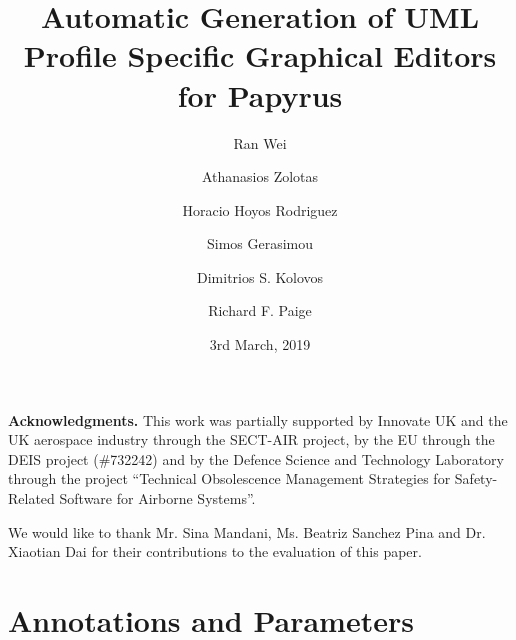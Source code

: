 \documentclass[global]{svjour}
\begin{document}
\title{Automatic Generation of UML Profile Specific Graphical Editors for Papyrus}

\author{Ran Wei \and Athanasios Zolotas \and Horacio Hoyos Rodriguez \and Simos Gerasimou \and Dimitrios S. Kolovos \and Richard F. Paige}

\date{3rd March, 2019}
\maketitle{}










\noindent\textbf{Acknowledgments.}
This work was partially supported by Innovate UK and the UK aerospace industry through the SECT-AIR project, by the EU through the DEIS project (\#732242) and by the Defence Science and Technology Laboratory through the project ``Technical Obsolescence Management Strategies for Safety-Related Software for Airborne Systems''.

We would like to thank Mr. Sina Mandani, Ms. Beatriz Sanchez Pina and Dr. Xiaotian Dai for their contributions to the evaluation of this paper.
\appendix
\section{Annotations and Parameters}

%
\clearpage


\end{document}
